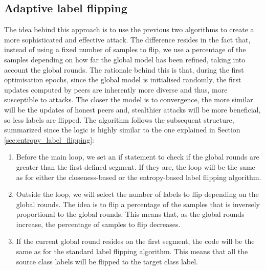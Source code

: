 \subsection{Adaptive label flipping}\label{sec:adaptive_label_flipping}
The idea behind this approach is to use the previous two algorithms to create a more sophisticated and effective attack. The difference resides in the fact that, instead of using a fixed number of samples to flip, we use a percentage of the samples depending on how far the global model has been refined, taking into account the global rounds. The rationale behind this is that, during the first optimisation epochs, since the global model is initialised randomly, the first updates computed by peers are inherently more diverse and thus, more susceptible to attacks. The closer the model is to convergence, the more similar will be the updates of honest peers and, stealthier attacks will be more beneficial, so less labels are flipped. The algorithm follows the subsequent structure, summarized since the logic is highly similar to the one explained in Section \ref{sec:entropy_label_flipping}:%
\begin{enumerate}
        \item Before the main loop, we set an if statement to check if the global rounds are greater than the first defined segment. If they are, the loop will be the same as for either the closeness-based or the entropy-based label flipping algorithm. 
        \item Outside the loop, we will select the number of labels to flip depending on the global rounds. The idea is to flip a percentage of the samples that is inversely proportional to the global rounds. This means that, as the global rounds increase, the percentage of samples to flip decreases.
        \item If the current global round resides on the first segment, the code will be the same as for the standard label flipping algorithm. This means that all the source class labels will be flipped to the target class label.
\end{enumerate}



\newpage